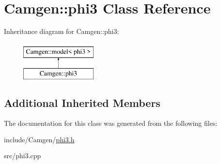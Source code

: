 \hypertarget{a00418}{\section{Camgen\-:\-:phi3 Class Reference}
\label{a00418}
}
Inheritance diagram for Camgen\-:\-:phi3\-:\begin{figure}[H]
\begin{center}
\leavevmode
\includegraphics[height=2.000000cm]{a00418}
\end{center}
\end{figure}
\subsection*{Additional Inherited Members}


The documentation for this class was generated from the following files\-:\begin{DoxyCompactItemize}
\item 
include/\-Camgen/\hyperlink{a00695}{phi3.\-h}\item 
src/phi3.\-cpp\end{DoxyCompactItemize}
